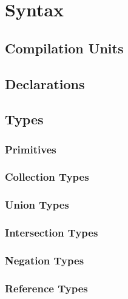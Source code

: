 \newcommand{\token}[1]{\fcolorbox{black}{lightgray}{\strut\texttt{#1}}}


\newcommand{\nullc}{\token{null}}
\newcommand{\comma}{\token{,}}
\newcommand{\colont}{\token{:}}
\newcommand{\dott}{\token{.}}
\newcommand{\lb}{\token{(}\;}
\newcommand{\rb}{\;\token{)}}
\newcommand{\ra}{\token{=>}}
\newcommand{\lsb}{\token{[}\;}
\newcommand{\rsb}{\;\token{]}}
\newcommand{\lcb}{\token{\{}\;}
\newcommand{\rcb}{\;\token{\}}}
\newcommand{\vbar}{\token{|}}

\chapter{Syntax}

\section{Compilation Units}
\section{Declarations}
\section{Types}
\subsection{Primitives}
\subsection{Collection Types}
\subsection{Union Types}
\subsection{Intersection Types}
\subsection{Negation Types}
\subsection{Reference Types}

